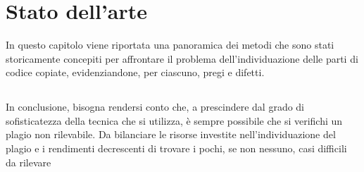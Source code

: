 \chapter{Stato dell'arte}
\label{chapter:stateOfArt}
In questo capitolo viene riportata una panoramica dei metodi che sono stati storicamente concepiti per affrontare il problema dell'individuazione delle parti di codice copiate, evidenziandone, per ciascuno, pregi e difetti.

\section{}

\section{}

In conclusione, bisogna rendersi conto che, a prescindere dal grado di sofisticatezza della tecnica che si utilizza, è sempre possibile che si verifichi un plagio non rilevabile.
%
Da bilanciare le risorse investite nell'individuazione del plagio e i rendimenti decrescenti di trovare i pochi, se non nessuno, casi difficili da rilevare \cite{joy-99}
